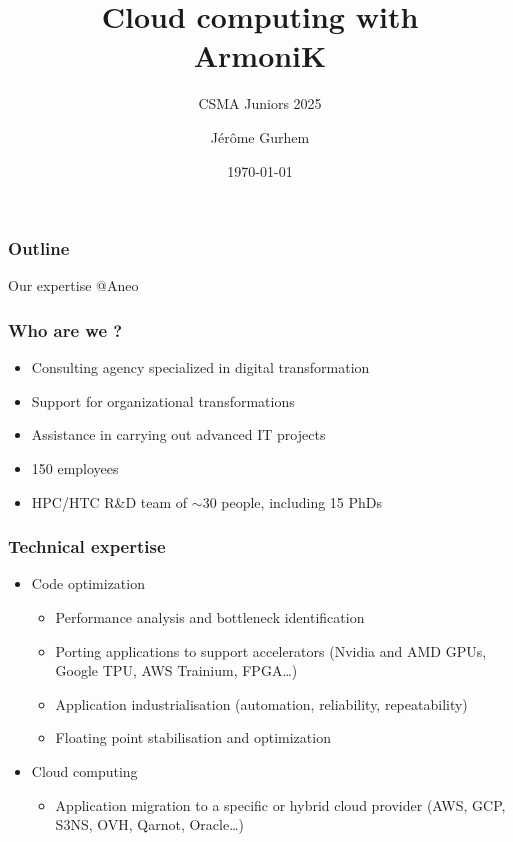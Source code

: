 \documentclass[10pt,aspectratio=1609]{beamer}
\begin{document}
\author{Jérôme Gurhem}
\title{Cloud computing with \\ ArmoniK}
\subtitle{CSMA Juniors 2025}
\date{\today}

\titlepage

\AtBeginSection[]
{
	\frame{\sectionpage}
}

\begin{frame}
	\frametitle{Outline}
	\large
	\tableofcontents
\end{frame}

\begin{section}{Our expertise @Aneo}
  \begin{frame}
    \frametitle{Who are we ?}
    \begin{itemize}
      \item Consulting agency specialized in digital transformation
      \item Support for organizational transformations
      \item Assistance in carrying out advanced IT projects
      \item 150 employees
      \item HPC/HTC R\&D team of $\sim$30 people, including 15 PhDs
    \end{itemize}
  \end{frame}

  \begin{frame}
    \frametitle{Technical expertise}
    \begin{itemize}
      \item Code optimization
      \begin{itemize}
        \item Performance analysis and bottleneck identification
        \item Porting applications to support accelerators (Nvidia and AMD GPUs, Google TPU, AWS Trainium, FPGA\dots)
        \item Application industrialisation (automation, reliability, repeatability)
        \item Floating point stabilisation and optimization
      \end{itemize}
      \item Cloud computing
      \begin{itemize}
        \item Application migration to a specific or hybrid cloud provider (AWS, GCP, S3NS, OVH, Qarnot, Oracle\dots)
      \end{itemize}
    \end{itemize}
  \end{frame}


\end{section}
\end{document}
